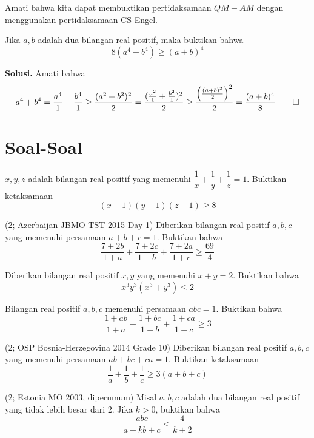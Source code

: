 \documentclass[11pt]{scrartcl}
\begin{document}
Amati bahwa kita dapat membuktikan pertidaksamaan $QM-AM$ dengan menggunakan pertidaksamaan CS-Engel.

\begin{example}
Jika $a,b$ adalah dua bilangan real positif, maka buktikan bahwa $$8(a^4 + b^4) \geq (a + b)^4$$
\end{example}
\textbf{Solusi.} Amati bahwa $$a^4 + b^4 = \frac{a^4}{1} + \frac{b^4}{1} \geq \frac{(a^2 + b^2)^2}{2} = \frac{(\frac{a^2}{1} + \frac{b^2}{1})^2}{2} \geq \frac{\Big(\frac{(a + b)^2}{2}\Big)^2}{2} = \frac{(a+b)^4}{8} \qed$$

\newpage
\section{Soal-Soal}
\begin{problem}
$x, y, z$ adalah bilangan real positif yang memenuhi $\dfrac{1}{x} + \dfrac{1}{y} + \dfrac{1}{z} = 1$. Buktikan ketaksamaan \[(x - 1)(y - 1)(z - 1) \geq 8\]
\end{problem}

\begin{problem}
(2; Azerbaijan JBMO TST 2015 Day 1) Diberikan bilangan real positif $a, b, c$ yang memenuhi persamaan $a + b + c = 1$. Buktikan bahwa \[\dfrac{7 + 2b}{1 + a} + \dfrac{7 + 2c}{1 + b} + \dfrac{7 + 2a}{1 + c} \geq \dfrac{69}{4}\]
\end{problem}

\begin{problem}
Diberikan bilangan real positif $x, y$ yang memenuhi $x + y = 2$. Buktikan bahwa \[x^3 y^3(x^3 + y^3) \leq 2\]
\end{problem}

\begin{problem}
Bilangan real positif $a, b, c$ memenuhi persamaan $abc = 1$. Buktikan bahwa \[\dfrac{1 + ab}{1 + a} + \dfrac{1 + bc}{1 + b} + \dfrac{1 + ca}{1 + c} \geq 3\]
\end{problem}

\begin{problem}
(2; OSP Bosnia-Herzegovina 2014 Grade 10) Diberikan bilangan real positif $a, b, c$ yang memenuhi persamaan $ab + bc + ca = 1$. Buktikan ketaksamaan \[\dfrac{1}{a} + \dfrac{1}{b} + \dfrac{1}{c} \geq 3(a + b + c)\]
\end{problem}

\begin{problem}
(2; Estonia MO 2003, diperumum) Misal $a, b, c$ adalah dua bilangan real positif yang tidak lebih besar dari $2$. Jika $k > 0$, buktikan bahwa \[\dfrac{abc}{a + kb + c} \leq \dfrac{4}{k + 2}\]
\end{problem}
\end{document}
